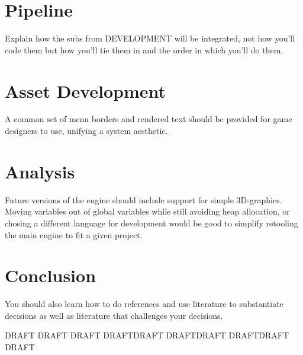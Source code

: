\documentclass[journal]{IEEEtran}
\begin{document}
\section{Pipeline}
Explain how the subs from DEVELOPMENT will be integrated, not how you'll code them but how you'll tie them in and the order in which you'll do them.

\section{Asset Development}
A common set of menu borders and rendered text should be provided for game designers to use, unifying a system aesthetic.

\section{Analysis}
Future versions of the engine should include support for simple 3D-graphics. 
Moving variables out of global variables while still avoiding heap allocation, or chosing a different language for development would be good to simplify retooling the main engine to fit a given project.

\section{Conclusion}

You should also learn how to do references and use literature to substantiate decisions as well as literature that challenges your decisions.

DRAFT DRAFT DRAFT DRAFTDRAFT DRAFTDRAFT DRAFTDRAFT DRAFT
\end{document}
